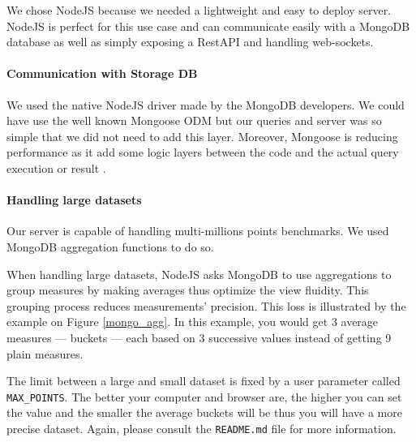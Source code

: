 \documentclass[a4paper,11pt]{report}
\begin{document}
We chose NodeJS because we needed a lightweight and easy to deploy server. NodeJS is perfect for this use case and can communicate easily with a MongoDB database as well as simply exposing a RestAPI and handling web-sockets.

\paragraph{Communication with Storage DB}\label{server:mongo}

We used the native NodeJS driver made by the MongoDB developers. We could have use the well known Mongoose ODM but our queries and server was so simple that we did not need to add this layer. Moreover, Mongoose is reducing performance as it add some logic layers between the code and the actual query execution or result \cite{mongo}.

\paragraph{Handling large datasets}\label{server:handling_large_dataset}

Our server is capable of handling multi-millions points benchmarks. We used MongoDB aggregation functions to do so.

When handling large datasets, NodeJS asks MongoDB to use aggregations to group measures by making averages thus optimize the view fluidity. This grouping process reduces measurements' precision. This loss is illustrated by the example on Figure \ref{mongo_agg}. In this example, you would get 3 average measures --- buckets --- each based on 3 successive values instead of getting 9 plain measures.

The limit between a large and small dataset is fixed by a user parameter called \texttt{MAX\_POINTS}. The better your computer and browser are, the higher you can set the value and the smaller the average buckets will be thus you will have a more precise dataset. Again, please consult the \texttt{README.md} file for more information.
\end{document}
